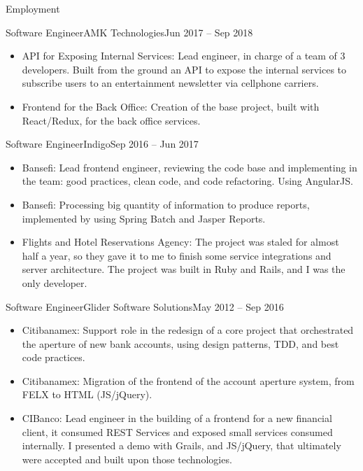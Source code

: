 \documentclass[calibri]{../macdowell-cv/mcdowellcv}
\begin{document}
	\makeheader
	
	\begin{cvsection}{Employment}
		\begin{cvsubsection}{Software Engineer}{AMK Technologies}{Jun 2017 -- Sep 2018}
			\begin{itemize}
				\item API for Exposing Internal Services: Lead engineer, in charge of a team of 3 developers. Built from the ground an API to expose the internal services to subscribe users to an entertainment newsletter via cellphone carriers.
			\end{itemize}
			\begin{itemize}
				\item Frontend for the Back Office: Creation of the base project, built with React/Redux, for the back office services.
			\end{itemize}
		\end{cvsubsection}

		\begin{cvsubsection}{Software Engineer}{Indigo}{Sep 2016 -- Jun 2017}		
			\begin{itemize}
				\item Bansefi: Lead frontend engineer, reviewing the code base and implementing in the team: good practices, clean code, and code refactoring. Using AngularJS.
				\item Bansefi: Processing big quantity of information to produce reports, implemented by using Spring Batch and Jasper Reports.
			\end{itemize}
			\begin{itemize}
				\item Flights and Hotel Reservations Agency: The project was staled for almost half a year, so they gave it to me to finish some service integrations and server architecture. The project was built in Ruby and Rails, and I was the only developer.
			\end{itemize}
		\end{cvsubsection}
		
		\begin{cvsubsection}{Software Engineer}{Glider Software Solutions}{May 2012 -- Sep 2016}	
			\begin{itemize}
				\item Citibanamex: Support role in the redesign of a core project that orchestrated the aperture of new bank accounts, using design patterns, TDD, and best code practices.
				\item Citibanamex: Migration of the frontend of the account aperture system, from FELX to HTML (JS/jQuery).
				\item CIBanco: Lead engineer in the building of a frontend for a new financial client, it consumed REST Services and exposed small services consumed internally. I presented a demo with Grails, and JS/jQuery, that ultimately were accepted and built upon those technologies.
			\end{itemize}
		\end{cvsubsection}


\end{cvsection}
\end{document}
